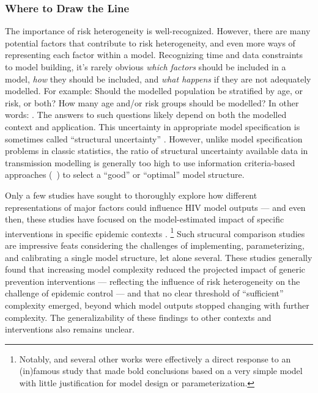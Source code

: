 \subsubsection{Where to Draw the Line}
The importance of risk heterogeneity is well-recognized.
However, there are many potential factors that contribute to risk heterogeneity,
and even more ways of representing each factor within a model.
Recognizing time and data constraints to model building, it's rarely obvious
\emph{which factors} should be included in a model,
\emph{how} they should be included, and
\emph{what happens} if they are not adequately modelled.
For example:
Should the modelled population be stratified by age, or risk, or both?
How many age and/or risk groups should be modelled?
In other words:  \cite{Suen2017}.
The answers to such questions likely depend on both the modelled context and application.
This uncertainty in appropriate model specification
is sometimes called ``structural uncertainty'' \cite{Bernard2017,Suen2017}.
However, unlike model specification problems in classic statistics,
the ratio of structural uncertainty \vs available data in transmission modelling
is generally too high to use information criteria-based approaches (\eg~\cite{Zhang2023})
to select a ``good'' or ``optimal'' model structure.
\par
Only a few studies have sought to thoroughly explore how
different representations of major factors could influence HIV model outputs
--- and even then, these studies have focused on the model-estimated impact of
specific interventions in specific epidemic contexts \cite{Hontelez2013,Bernard2017}.%
\footnote{Notably, \cite{Hontelez2013} and several other works \cite{Eaton2012}
  were effectively a direct response to an (in)famous study \cite{Granich2009}
  that made bold conclusions based on a very simple model
  with little justification for model design or parameterization.}
Such strucural comparison studies are impressive feats considering the challenges of
implementing, parameterizing, and calibrating a single model structure, let alone several.
These studies generally found that
increasing model complexity reduced the projected impact of generic prevention interventions
--- reflecting the influence of risk heterogeneity on the challenge of epidemic control ---
and that no clear threshold of ``sufficient'' complexity emerged,
beyond which model outputs stopped changing with further complexity.
The generalizability of these findings to other contexts and interventions also remains unclear.
